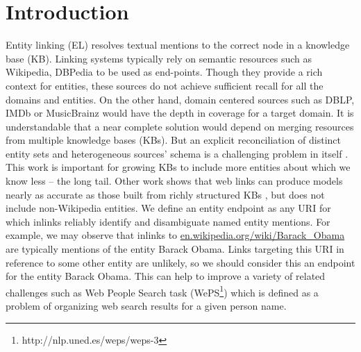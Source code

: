 \documentclass{sig-alternate-05-2015}
\begin{document}


%
%

%
%



\section{Introduction}

Entity linking (EL) resolves textual mentions to the correct node in a knowledge base (KB). Linking systems typically rely on semantic resources such as Wikipedia, DBPedia to be used as end-points. Though they provide a rich context for entities, these sources do not achieve sufficient recall for all the domains and entities. On the other hand, domain centered sources such as DBLP, IMDb or MusicBrainz would have the depth in coverage for a target domain. It is understandable that a near complete solution would depend on merging resources from multiple knowledge bases (KBs). But an explicit reconciliation of distinct entity sets and heterogeneous sources' schema is a challenging problem in itself \cite{chisholm2016akbc}.  This work is important for growing KBs to include more entities about which we know less -- the long tail. Other work shows that web links can produce models nearly as accurate as those built from richly structured KBs \cite{chisholm2015entity}, but does not include non-Wikipedia entities. We define an entity endpoint as any URI for which inlinks reliably identify and disambiguate named entity mentions. For example, we may observe that inlinks to \url{en.wikipedia.org/wiki/Barack_Obama} are typically mentions of the entity Barack Obama. Links targeting this URI in reference to some other entity are unlikely, so we should consider this an endpoint for the entity Barack Obama. This can help to improve a variety of related challenges such as Web People Search task (WePS\footnote{ http://nlp.uned.es/weps/weps-3}) which is defined as a problem of organizing web search results for a given person name.

\end{document}
